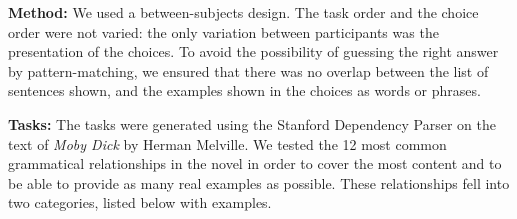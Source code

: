 {\bf Method:} We used a between-subjects design. The task order and the choice order were not varied: the only variation between participants was the presentation of the choices. To avoid the possibility of  guessing the right answer by pattern-matching, we ensured that there was no overlap between the list of sentences shown, and the examples shown in the choices as words or phrases.

{\bf Tasks:} The tasks were generated using the Stanford Dependency Parser \cite{de2006generating} on the text of \emph{Moby Dick} by Herman Melville. We tested the 12 most common grammatical relationships in the novel in order to cover the most content and to be able to provide as many real examples as possible. These relationships fell into two categories, listed below with examples.












